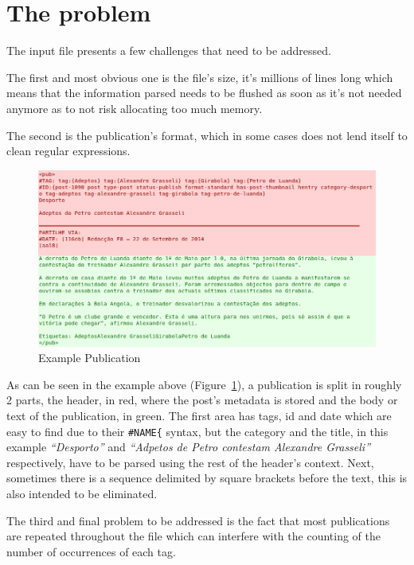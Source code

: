 \documentclass[a4paper]{article}
\begin{document}
\section{The problem}

The input file presents a few challenges that need to be addressed.

The first and most obvious one is the file's size, it's millions of lines long
which means that the information parsed needs to be flushed as soon as it's not
needed anymore as to not risk allocating too much memory.

The second is the publication's format, which in some cases does not lend itself to clean regular expressions.

\begin{figure}[H]
    \includegraphics[width=\textwidth]{./example_pub_colored_simple.png}
    \caption{Example Publication}\label{fig:example_pub_simple}
\end{figure}

As can be seen in the example above (Figure~\ref{fig:example_pub_simple}), a
publication is split in roughly 2 parts, the header, in red, where the post's
metadata is stored and the body or text of the publication, in green. The first
area has tags, id and date which are easy to find due to their
\texttt{\#NAME\{} syntax, but the category and the title, in this example
\textit{``Desporto''} and \textit{``Adpetos de Petro contestam Alexandre
Grasseli''} respectively, have to be parsed using the rest of the header's
context. Next, sometimes there is a sequence delimited by square brackets before
the text, this is also intended to be eliminated.

The third and final problem to be addressed is the fact that most publications
are repeated throughout the file which can interfere with the counting of the
number of occurrences of each tag.
\end{document}
